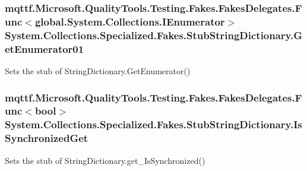 \hypertarget{class_system_1_1_collections_1_1_specialized_1_1_fakes_1_1_stub_string_dictionary_a77acdaec1c7042e516116d6ab99486e6}{
\subsubsection[{Get\-Enumerator01}]{\setlength{\rightskip}{0pt plus 5cm}mqttf.\-Microsoft.\-Quality\-Tools.\-Testing.\-Fakes.\-Fakes\-Delegates.\-Func$<$global.\-System.\-Collections.\-I\-Enumerator$>$ System.\-Collections.\-Specialized.\-Fakes.\-Stub\-String\-Dictionary.\-Get\-Enumerator01}}\label{class_system_1_1_collections_1_1_specialized_1_1_fakes_1_1_stub_string_dictionary_a77acdaec1c7042e516116d6ab99486e6}


Sets the stub of String\-Dictionary.\-Get\-Enumerator()

\hypertarget{class_system_1_1_collections_1_1_specialized_1_1_fakes_1_1_stub_string_dictionary_a6d6a19d02b1ab89583fe4632da73f912}{
\subsubsection[{Is\-Synchronized\-Get}]{\setlength{\rightskip}{0pt plus 5cm}mqttf.\-Microsoft.\-Quality\-Tools.\-Testing.\-Fakes.\-Fakes\-Delegates.\-Func$<$bool$>$ System.\-Collections.\-Specialized.\-Fakes.\-Stub\-String\-Dictionary.\-Is\-Synchronized\-Get}}\label{class_system_1_1_collections_1_1_specialized_1_1_fakes_1_1_stub_string_dictionary_a6d6a19d02b1ab89583fe4632da73f912}


Sets the stub of String\-Dictionary.\-get\-\_\-\-Is\-Synchronized()

